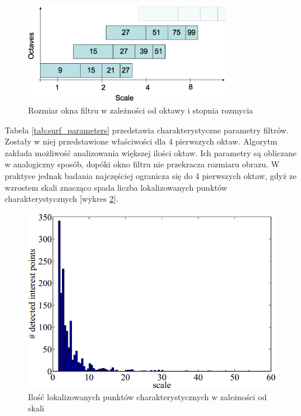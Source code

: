 \begin{figure}[!htb]
\centering
\includegraphics[width=0.8\textwidth]{pict/02/surf/surf_bay_octave_scale.png}
\caption{Rozmiar okna filtru w zależności od oktawy i stopnia rozmycia}
\label{fig:surf_bay_octave_scale}
\end{figure}
Tabela \ref{tab:surf_parameters} przedstawia charakterystyczne parametry filtrów. Zostały w niej przedstawione właściwości dla 4 pierwszych oktaw. Algorytm zakłada możliwość analizowania większej ilości oktaw. Ich parametry są obliczane w analogiczny sposób, dopóki okno filtru nie przekracza rozmiaru obrazu. W praktyce jednak badania najczęściej ogranicza się do 4 pierwszych oktaw, gdyż ze wzrostem skali znacząco spada liczba lokalizowanych punktów charakterystycznych [wykres \ref{fig:surf_bay_scale_histogram}].


\begin{figure}[!htb]
\centering
\includegraphics[scale=0.7]{pict/02/surf/surf_bay_scale_histogram.png}
\caption{Ilość lokalizowanych punktów charakterystycznych w zależności od skali}
\label{fig:surf_bay_scale_histogram}
\end{figure}










